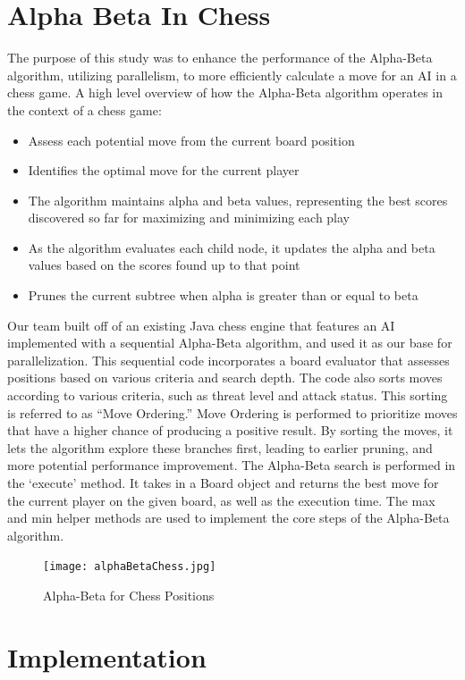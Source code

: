 \documentclass[conference, 11pt]{IEEEtran}
\begin{document}
\section{Alpha Beta In Chess}
The purpose of this study was to enhance the performance of the Alpha-Beta algorithm, utilizing parallelism, to more efficiently calculate a move for an AI in a chess game.
A high level overview of how the Alpha-Beta algorithm operates in the context of a chess game:
\begin{itemize}
  \item Assess each potential move from the current board position
  \item Identifies the optimal move for the current player
  \item The algorithm maintains alpha and beta values, representing the best scores discovered so far for maximizing and minimizing each play
  \item As the algorithm evaluates each child node, it updates the alpha and beta values based on the scores found up to that point
  \item Prunes the current subtree when alpha is greater than or equal to beta
\end{itemize}

Our team built off of an existing Java chess engine that features an AI implemented with a sequential Alpha-Beta algorithm, and used it as our base for parallelization.
This sequential code incorporates a board evaluator that assesses positions based on various criteria and search depth. The code also sorts moves according to various criteria, such as threat level and attack status. This sorting is referred to as “Move Ordering.” Move Ordering is performed to prioritize moves that have a higher chance of producing a positive result. By sorting the moves, it lets the algorithm explore these branches first, leading to earlier pruning, and more potential performance improvement. The Alpha-Beta search is performed in the ‘execute’ method. It takes in a Board object and returns the best move for the current player on the given board, as well as the execution time. The max and min helper methods are used to implement the core steps of the Alpha-Beta algorithm.

\begin{figure}[htbp]
\centerline{\texttt{[image: alphaBetaChess.jpg]}}
\caption{Alpha-Beta for Chess Positions}
\label{fig}
\end{figure}

\section{Implementation}
\end{document}
